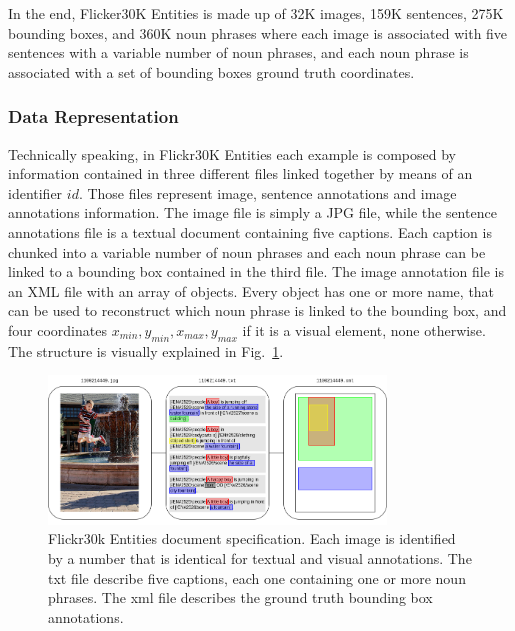 In the end, Flicker30K Entities is made up of 32K images, 159K
sentences, 275K bounding boxes, and 360K noun phrases where each image
is associated with five sentences with a variable number of noun
phrases, and each noun phrase is associated with a set of bounding
boxes ground truth coordinates. 

\subsubsection{Data Representation}
\label{subsec:flickr30k-data-representation}

Technically speaking, in Flickr30K Entities each example is composed
by information contained in three different files linked together by
means of an identifier $id$. Those files represent image, sentence
annotations and image annotations information. The image file is
simply a JPG file, while the sentence annotations file is a textual
document containing five captions. Each caption is chunked into a
variable number of noun phrases and each noun phrase can be linked to
a bounding box contained in the third file. The image annotation file
is an XML file with an array of objects. Every object has one or more
name, that can be used to reconstruct which noun phrase is linked to
the bounding box, and four coordinates $x_{min}, y_{min}, x_{max},
y_{max}$ if it is a visual element, none otherwise. The structure is
visually explained in
Fig.~\ref{fig:flickr30k-technical-data-representation}.

\begin{figure}
  \centering
  \includegraphics[width=0.8\textwidth]{figures/flickr30k-document-specification.png}
  \caption[Flickr30k Entities document specification]{ Flickr30k
    Entities document specification. Each image is identified by a
    number that is identical for textual and visual annotations. The
    txt file describe five captions, each one containing one or more
    noun phrases. The xml file describes the ground truth bounding box
    annotations. }
  \label{fig:flickr30k-technical-data-representation}
\end{figure}

